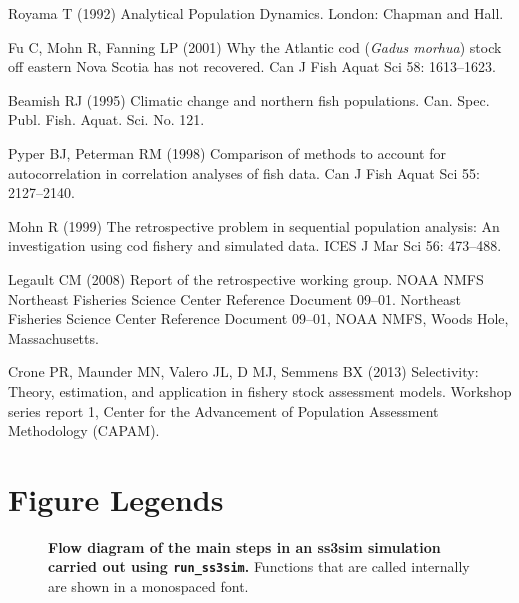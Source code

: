 \documentclass[10pt]{article}
\providecommand{\DIFaddbegin}{} %
\providecommand{\DIFaddend}{} %
\begin{document}
\begin{thebibliography}{10}
Royama T (1992) Analytical Population Dynamics.
\newblock London: Chapman and Hall.

Fu C, Mohn R, Fanning LP (2001) Why the {Atlantic cod} (\textit{Gadus morhua})
  stock off eastern {Nova Scotia} has not recovered.
\newblock Can J Fish Aquat Sci 58: 1613--1623.

Beamish RJ (1995) Climatic change and northern fish populations.
\newblock Can. Spec. Publ. Fish. Aquat. Sci. No. 121.

Pyper BJ, Peterman RM (1998) Comparison of methods to account for
  autocorrelation in correlation analyses of fish data.
\newblock Can J Fish Aquat Sci 55: 2127--2140.

Mohn R (1999) The retrospective problem in sequential population analysis: An
  investigation using cod fishery and simulated data.
\newblock ICES J Mar Sci 56: 473--488.

Legault CM (2008) Report of the retrospective working group. {NOAA NMFS
  Northeast Fisheries Science Center Reference Document} 09--01.
\newblock Northeast Fisheries Science Center Reference Document 09--01, NOAA
  NMFS, Woods Hole, Massachusetts.

Crone PR, Maunder MN, Valero JL, D MJ, Semmens BX (2013) Selectivity: Theory,
  estimation, and application in fishery stock assessment models.
\newblock Workshop series report 1, Center for the Advancement of Population
  Assessment Methodology (CAPAM).

\DIFaddbegin \end{thebibliography}


\DIFaddend \clearpage

\section*{Figure Legends}

\begin{figure}[!ht]
 \begin{center}
 \end{center}
\caption{
{\bf Flow diagram of the main steps in an ss3sim simulation carried out using
  \texttt{run\_ss3sim}.} Functions that are called internally are shown in a
monospaced font.
}
\label{fig:sim-steps}
\end{figure}
\end{document}
